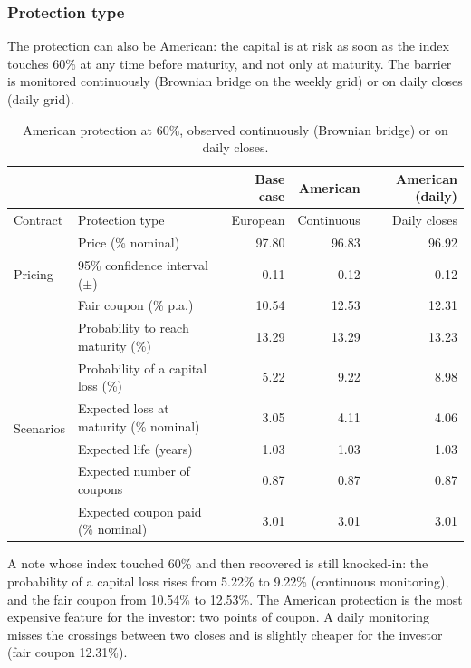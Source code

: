 \documentclass[11pt,a4paper]{article}
\begin{document}
\clearpage
\subsubsection{Protection type}

The protection can also be American: the capital is at risk as soon as the index touches 60\% at any time before
maturity, and not only at maturity. The barrier is monitored continuously (Brownian bridge on the weekly grid) or on
daily closes (daily grid).

\begin{table}[htbp]
  \centering
  \small
  \begin{tabular}{llrrr}
    \toprule
     & & \textbf{Base case} & \textbf{American} & \textbf{American (daily)} \\
    \midrule
    \multirow{1}{*}{Contract}
      & Protection type & European & Continuous & Daily closes \\
    \midrule
    \multirow{3}{*}{Pricing}
      & Price (\% nominal) & 97.80 & 96.83 & 96.92 \\
      & 95\% confidence interval ($\pm$) & 0.11 & 0.12 & 0.12 \\
      & Fair coupon (\% p.a.) & 10.54 & 12.53 & 12.31 \\
    \midrule
    \multirow{6}{*}{Scenarios}
      & Probability to reach maturity (\%) & 13.29 & 13.29 & 13.23 \\
      & Probability of a capital loss (\%) & 5.22 & 9.22 & 8.98 \\
      & Expected loss at maturity (\% nominal) & 3.05 & 4.11 & 4.06 \\
      & Expected life (years) & 1.03 & 1.03 & 1.03 \\
      & Expected number of coupons & 0.87 & 0.87 & 0.87 \\
      & Expected coupon paid (\% nominal) & 3.01 & 3.01 & 3.01 \\
    \bottomrule
  \end{tabular}
  \caption{American protection at 60\%, observed continuously (Brownian bridge) or on daily closes.}
  \label{tab:athena-american}
\end{table}

A note whose index touched 60\% and then recovered is still knocked-in: the probability of a capital loss rises from
5.22\% to 9.22\% (continuous monitoring), and the fair coupon from 10.54\% to 12.53\%. The American protection is the
most expensive feature for the investor: two points of coupon. A daily monitoring misses the crossings between two
closes and is slightly cheaper for the investor (fair coupon 12.31\%).
\end{document}
